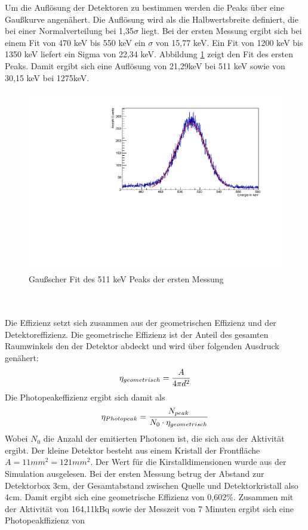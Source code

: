 \documentclass[a4paper,11pt,twoside]{article}
\begin{document}
Um die Auflösung der Detektoren zu bestimmen werden die Peaks über eine Gaußkurve angenähert. Die Auflösung wird als die Halbwertsbreite definiert, die bei einer Normalverteilung bei 1,35$\sigma$ liegt. Bei der ersten Messung ergibt sich bei einem Fit von 470 keV bis 550 keV ein $\sigma$ von 15,77 keV. Ein Fit von 1200 keV bis 1350 keV liefert ein Sigma von 22,34 keV. Abbildung \ref{l2} zeigt den Fit des ersten Peaks. Damit ergibt sich eine Auflösung von 21,29keV bei 511 keV sowie von 30,15 keV bei 1275keV.
\begin{figure}[htbp]
\begin{center}
\includegraphics[width=\textwidth]{Fit1.pdf}
\caption{Gaußscher Fit des 511 keV Peaks der ersten Messung}
\label{l2}
\end{center}
\end{figure}
\\\\
Die Effizienz setzt sich zusammen aus der geometrischen Effizienz und der Detektoreffizienz. Die geometrische Effizienz ist der Anteil des gesamten Raumwinkels den der Detektor abdeckt und wird über folgenden Ausdruck genähert:
\begin{equation}
\eta_{geometrisch}={A\over 4 \pi d^2}
\end{equation}
Die Photopeakeffizienz ergibt sich damit als
\begin{equation}
\eta_{Photopeak}={N_{peak}\over N_0\cdot\eta_{geometrisch}}
\end{equation}
Wobei $N_0$ die Anzahl der emitierten Photonen ist, die sich aus der Aktivität ergibt. Der kleine Detektor besteht aus einem Kristall der Frontfläche $A=11mm^2=121mm^2$. Der Wert für die Kirstalldimensionen wurde aus der Simulation ausgelesen. Bei der ersten Messung betrug der Abstand zur Detektorbox 3cm, der Gesamtabstand zwischen Quelle und Detektorkristall also 4cm. Damit ergibt sich eine geometrische Effizienz von 0,602\%. Zusammen mit der Aktivität von 164,11kBq sowie der Messzeit von 7 Minuten ergibt sich eine Photopeakffizienz von
\end{document}
